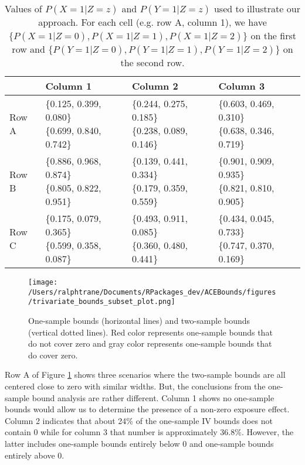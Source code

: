 \documentclass[
]{article}
\theoremstyle{plain}
\begin{document}
\begin{table}[H]
  \center
  \caption{Values of $P(X = 1 | Z = z)$ and $P(Y = 1 | Z = z)$ used to illustrate our approach. For each cell (e.g. row A, column 1), we have $\{P(X = 1 | Z = 0), P(X = 1 | Z = 1), P(X = 1 | Z = 2)\}$ on the first row and $\{P(Y = 1 | Z = 0), P(Y = 1 | Z = 1), P(Y = 1 | Z = 2)\}$ on the second row.}
  \label{tab:subset_plot_summaries}
  
\begin{tabular}{llll}
\toprule
  & Column 1 & Column 2 & Column 3\\
\midrule
Row A & \makecell[l]{\{0.125, 0.399, 0.080\}\\\{0.699, 0.840, 0.742\}} & \makecell[c]{\{0.244, 0.275, 0.185\}\\\{0.238, 0.089, 0.146\}} & \makecell[r]{\{0.603, 0.469, 0.310\}\\\{0.638, 0.346, 0.719\}}\\
Row B & \makecell[l]{\{0.886, 0.968, 0.874\}\\\{0.805, 0.822, 0.951\}} & \makecell[c]{\{0.139, 0.441, 0.334\}\\\{0.179, 0.359, 0.559\}} & \makecell[r]{\{0.901, 0.909, 0.935\}\\\{0.821, 0.810, 0.905\}}\\
Row C & \makecell[l]{\{0.175, 0.079, 0.365\}\\\{0.599, 0.358, 0.087\}} & \makecell[c]{\{0.493, 0.911, 0.085\}\\\{0.360, 0.480, 0.441\}} & \makecell[r]{\{0.434, 0.045, 0.733\}\\\{0.747, 0.370, 0.169\}}\\
\bottomrule
\end{tabular}


\end{table}

\begin{figure}[H]
  \center
  \texttt{[image: /Users/ralphtrane/Documents/RPackages\_dev/ACEBounds/figures/trivariate\_bounds\_subset\_plot.png]}
  \caption{One-sample bounds (horizontal lines) and two-sample bounds (vertical dotted lines). Red color represents one-sample bounds that do not cover zero and gray color represents one-sample bounds that do cover zero.}
  \label{fig:trivariate_bounds}
\end{figure}

Row A of Figure \ref{fig:trivariate_bounds} shows three scenarios where the two-sample bounds are all centered close to zero with similar widths. But, the conclusions from the one-sample bound analysis are rather different. Column 1 shows no one-sample bounds would allow us to determine the presence of a non-zero exposure effect. Column 2 indicates that about 24\% of the one-sample IV bounds does not contain \(0\) while for column 3 that number is approximately 36.8\%. However, the latter includes one-sample bounds entirely below 0 and one-sample bounds entirely above 0.
\end{document}
